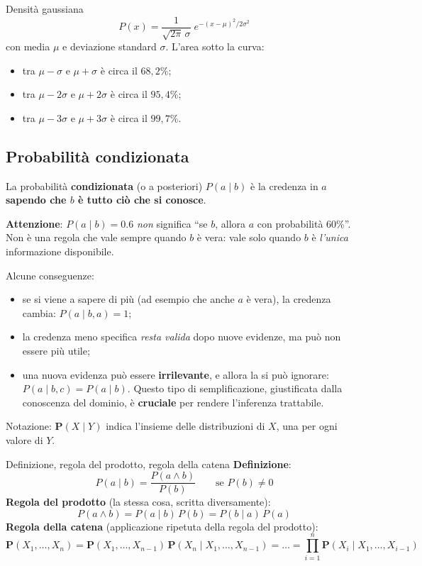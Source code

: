 \documentclass[11pt, a4paper]{article}
\renewcommand{\emph}[1]{\textcolor{verdechiaro}{\itshape #1}}
\newcommand{\Pv}{\mathbf{P}}               %
\begin{document}
\begin{defbox}{Densità gaussiana}
  \[
    P(x) = \frac{1}{\sqrt{2\pi}\,\sigma}\; e^{-(x-\mu)^2 / 2\sigma^2}
  \]
  con media $\mu$ e deviazione standard $\sigma$. L'area sotto la curva:
  \begin{itemize}
    \item tra $\mu-\sigma$ e $\mu+\sigma$ è circa il $68{,}2\%$;
    \item tra $\mu-2\sigma$ e $\mu+2\sigma$ è circa il $95{,}4\%$;
    \item tra $\mu-3\sigma$ e $\mu+3\sigma$ è circa il $99{,}7\%$.
  \end{itemize}
\end{defbox}

\subsection{Probabilità condizionata}

La probabilità \textbf{condizionata} (o a posteriori) $P(a \mid b)$ è la credenza in $a$ \textbf{sapendo che $b$ è tutto ciò che si conosce}.

\textbf{Attenzione}: $P(a \mid b) = 0.6$ \emph{non} significa ``se $b$, allora $a$ con probabilità 60\%''. Non è una regola che vale sempre quando $b$ è vera: vale solo quando $b$ è \emph{l'unica} informazione disponibile.

Alcune conseguenze:
\begin{itemize}
  \item se si viene a sapere di più (ad esempio che anche $a$ è vera), la credenza cambia: $P(a \mid b, a) = 1$;
  \item la credenza meno specifica \emph{resta valida} dopo nuove evidenze, ma può non essere più utile;
  \item una nuova evidenza può essere \textbf{irrilevante}, e allora la si può ignorare: $P(a \mid b, c) = P(a \mid b)$. Questo tipo di semplificazione, giustificata dalla conoscenza del dominio, è \textbf{cruciale} per rendere l'inferenza trattabile.
\end{itemize}

Notazione: $\Pv(X \mid Y)$ indica l'insieme delle distribuzioni di $X$, una per ogni valore di $Y$.

\begin{chiave}{Definizione, regola del prodotto, regola della catena}
  \textbf{Definizione}:
  \[
    P(a \mid b) = \frac{P(a \land b)}{P(b)} \qquad \text{se } P(b) \neq 0
  \]
  \textbf{Regola del prodotto} (la stessa cosa, scritta diversamente):
  \[
    P(a \land b) = P(a \mid b)\,P(b) = P(b \mid a)\,P(a)
  \]
  \textbf{Regola della catena} (applicazione ripetuta della regola del prodotto):
  \[
    \Pv(X_1, \dots, X_n) = \Pv(X_1, \dots, X_{n-1})\,\Pv(X_n \mid X_1, \dots, X_{n-1})
    = \dots = \prod_{i=1}^{n} \Pv(X_i \mid X_1, \dots, X_{i-1})
  \]
\end{chiave}
\end{document}
